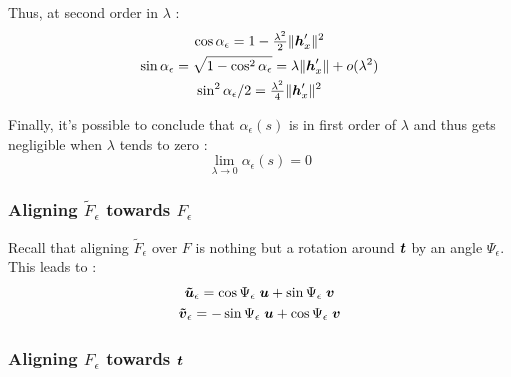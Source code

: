 Thus, at second order in $\lambda$ :
\begin{subequations}
	\begin{gather}
		\cos \alpha_\epsilon = 1 - \tfrac{\lambda^2}{2}\|\boldsymbol{h}_x'\|^2
		\\
		\sin \alpha_\epsilon = \sqrt{1-\cos^2 \alpha_\epsilon} = \lambda\|\boldsymbol{h}_x'\| + o(\lambda^2)
		\\
		\sin^2 {\alpha_\epsilon}{/2} = \tfrac{\lambda^2}{4}\|\boldsymbol{h}_x'\|^2
	\end{gather}
\end{subequations}

Finally, it's possible to conclude that $\alpha_\epsilon(s)$ is in first order of $\lambda$ and thus gets negligible when $\lambda$ tends to zero :
\begin{equation}
	\lim_{\lambda \to 0} \alpha_\epsilon(s) = 0
\end{equation}


\subsubsection{Aligning $\tilde{F}_\epsilon$ towards $F_\epsilon$}
Recall that aligning $\tilde{F}_\epsilon$ over $F$ is nothing but a rotation around $\boldsymbol{t}$ by an angle $\Psi_\epsilon$. This leads to :
\begin{subequations}
	\begin{gather}
		\boldsymbol{\tilde{u}}_\epsilon = \cos{\Psi_\epsilon}\;\boldsymbol{u} + \sin{\Psi_\epsilon}\;\boldsymbol{v}\\
		\boldsymbol{\tilde{v}}_\epsilon = -\sin{\Psi_\epsilon}\;\boldsymbol{u} + \cos{\Psi_\epsilon}\;\boldsymbol{v}
	\end{gather}
\end{subequations}

\subsubsection{Aligning $F_\epsilon$ towards $\boldsymbol{t}$}

